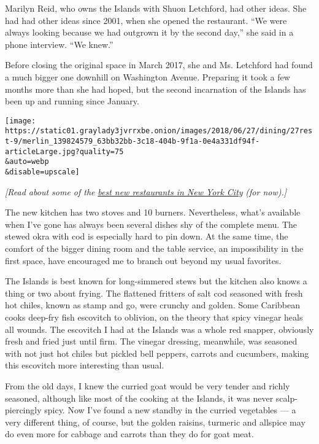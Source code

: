 Marilyn Reid, who owns the Islands with Shuon Letchford, had other
ideas. She had had other ideas since 2001, when she opened the
restaurant. ``We were always looking because we had outgrown it by the
second day,'' she said in a phone interview. ``We knew.''

Before closing the original space in March 2017, she and Ms. Letchford
had found a much bigger one downhill on Washington Avenue. Preparing it
took a few months more than she had hoped, but the second incarnation of
the Islands has been up and running since January.

\texttt{[image: https://static01.graylady3jvrrxbe.onion/images/2018/06/27/dining/27rest-9/merlin\_139824579\_63bb32bb-3c18-404b-9f1a-0e4a331df94f-articleLarge.jpg?quality=75\\\&auto=webp\\\&disable=upscale]}

\emph{{[}Read about some of the}
\href{https://www.nytimes3xbfgragh.onion/2018/11/15/nyregion/best-new-nyc-restaurants.html?action=click\&module=Intentional\&pgtype=Article}{\emph{best
new restaurants in New York City}} \emph{(for now).{]}}

The new kitchen has two stoves and 10 burners. Nevertheless, what's
available when I've gone has always been several dishes shy of the
complete menu. The stewed okra with cod is especially hard to pin down.
At the same time, the comfort of the bigger dining room and the table
service, an impossibility in the first space, have encouraged me to
branch out beyond my usual favorites.

The Islands is best known for long-simmered stews but the kitchen also
knows a thing or two about frying. The flattened fritters of salt cod
seasoned with fresh hot chiles, known as stamp and go, were crunchy and
golden. Some Caribbean cooks deep-fry fish escovitch to oblivion, on the
theory that spicy vinegar heals all wounds. The escovitch I had at the
Islands was a whole red snapper, obviously fresh and fried just until
firm. The vinegar dressing, meanwhile, was seasoned with not just hot
chiles but pickled bell peppers, carrots and cucumbers, making this
escovitch more interesting than usual.

From the old days, I knew the curried goat would be very tender and
richly seasoned, although like most of the cooking at the Islands, it
was never scalp-piercingly spicy. Now I've found a new standby in the
curried vegetables --- a very different thing, of course, but the golden
raisins, turmeric and allspice may do even more for cabbage and carrots
than they do for goat meat.

